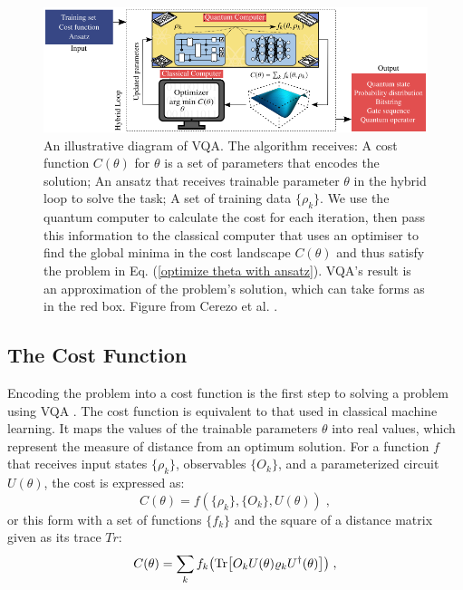 \begin{figure}
    \centering
    \includegraphics[width=\textwidth]{LiteratureReview/Appendices/vqadiagram.png}
    \caption{
    An illustrative diagram of VQA. The algorithm receives: 
    A cost function $C(\theta)$ for $\theta$ is a set of parameters that encodes the solution; 
    An ansatz that receives trainable parameter $\theta$ in the hybrid loop to solve the task;
    A set of training data $\{\rho_k\}$.
    We use the quantum computer to calculate the cost for each iteration, then pass this information to the classical computer that uses an optimiser to find the global minima in the cost landscape $C(\theta)$ and thus satisfy the problem in Eq. (\ref{optimize theta with ansatz}).
    VQA's result is an approximation of the problem's solution, which can take forms as in the red box.
    Figure from Cerezo et al. \cite{cerezo2021variational}.
    }
    \label{VQA diagram}
\end{figure}

\subsection{The Cost Function}
Encoding the problem into a cost function is the first step to solving a problem using VQA \cite{cerezo2021variational}.
The cost function is equivalent to that used in classical machine learning. 
It maps the values of the trainable parameters $\theta$ into real values, which represent the measure of distance from an optimum solution.
For a function $f$ that receives input states $\{\rho_k\}$, observables $\{O_k\}$, and a parameterized circuit $U(\theta)$, the cost is expressed as:
\begin{equation}
    C(\theta) = f(\{\rho_k\}, \{O_k\}, U(\theta)) \;,
\end{equation}
or this form with a set of functions $\{ f_k \}$ and the square of a distance matrix given as its trace $Tr$:
\begin{equation}
    C(\theta) = \sum_k f_k \left(\Tr[ O_k U(\theta) \rho_k U^\dagger(\theta) ]\right) \;,
    \label{Cost function}
\end{equation}


